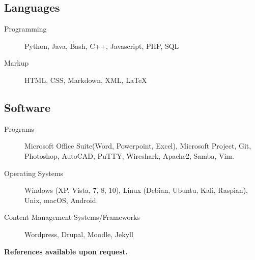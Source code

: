 \documentclass{article}
\begin{document}
\begin{multicols}{2}
\subsection{Languages}
\begin{description}
\item[Programming] Python, Java, Bash, C++, Javascript, PHP, SQL
\item[Markup] HTML, CSS, Markdown, XML, {\LaTeX}
\end{description}

\subsection{Software}

\begin{description}
\item[Programs] Microsoft Office Suite(Word, Powerpoint, Excel), Microsoft Project, Git, Photoshop, AutoCAD, PuTTY, Wireshark, Apache2, Samba, Vim.
\item[Operating Systems] Windows (XP, Vista, 7, 8, 10), Linux (Debian, Ubuntu, Kali, Raspian), Unix,  macOS, Android. 
\item[Content Management Systems/Frameworks] Wordpress, Drupal, Moodle, Jekyll
\end{description}


\end{multicols}

\begin{center}
\textbf{References available upon request.}
\end{center}
\end{document}
